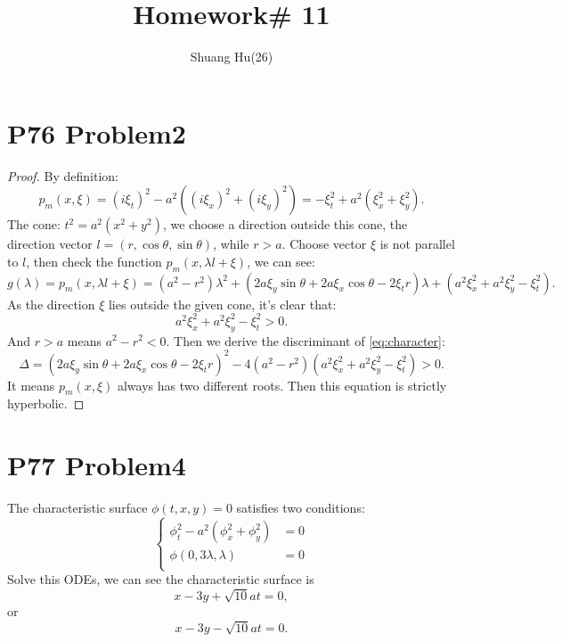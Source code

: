 \documentclass[a4paper]{ctexart}
\title{Homework\# 11}
\author{Shuang Hu(26)}
\begin{document}
\maketitle
\section*{P76 Problem2}
\begin{proof}
    By definition:
    \begin{equation}
        p_{m}(x,\xi)=(i\xi_{t})^{2}-a^2((i\xi_{x})^2+(i\xi_{y})^{2})
        =-\xi_{t}^2+a^2(\xi_{x}^2+\xi_{y}^2).
    \end{equation}
    The cone: $t^2=a^2(x^2+y^2)$, we choose a direction outside this cone, the direction vector $l=(r,\cos\theta,\sin\theta)$, while $r>a$. Choose vector $\xi$ is not parallel to $l$, then check the function $p_{m}(x,\lambda l+\xi)$, we can see:
    \begin{equation}
        \label{eq:character}
        g(\lambda)=p_{m}(x,\lambda l+\xi)=(a^2-r^2)\lambda^2+(2a\xi_{y}\sin\theta+2a\xi_{x}\cos\theta-2\xi_{t}r)\lambda+(a^2\xi_{x}^2+a^2\xi_{y}^2-\xi_{t}^{2}).
    \end{equation}
    As the direction $\xi$ lies outside the given cone, it's clear that:
    \begin{equation}
        a^2\xi_{x}^2+a^2\xi_{y}^2-\xi_{t}^{2}>0.
    \end{equation}
    And $r>a$ means $a^2-r^2<0$. Then we derive the discriminant of \eqref{eq:character}:
    \begin{equation}
        \Delta=(2a\xi_{y}\sin\theta+2a\xi_{x}\cos\theta-2\xi_{t}r)^2-4(a^2-r^2)(a^2\xi_{x}^2+a^2\xi_{y}^2-\xi_{t}^{2})>0.
    \end{equation}
    It means $p_{m}(x,\xi)$ always has two different roots. Then this equation is strictly hyperbolic.
\end{proof}
\section*{P77 Problem4}
The characteristic surface $\phi(t,x,y)=0$ satisfies two conditions:
\begin{equation}
    \label{eq:char-surface}
    \left\{
        \begin{aligned}
           \phi_{t}^2-a^2(\phi_{x}^{2}+\phi_{y}^{2})&=0\\
           \phi(0,3\lambda,\lambda)&=0\\ 
        \end{aligned}
    \right.
\end{equation}
Solve this ODEs, we can see the characteristic surface is 
\begin{equation}
    x-3y+\sqrt{10}at=0,
\end{equation}
or
\begin{equation}
    x-3y-\sqrt{10}at=0.
\end{equation}
\end{document}
